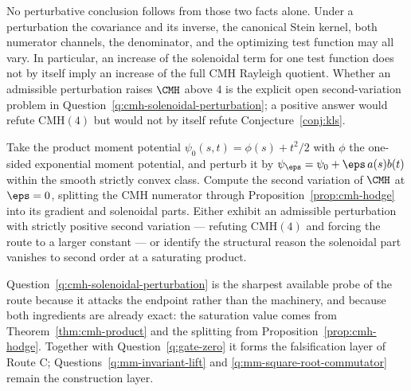 \documentclass[../../main.tex]{subfiles}
\begin{document}
\begin{remark}
No perturbative conclusion follows from those two facts alone. Under a perturbation the
covariance and its inverse, the canonical Stein kernel, both numerator channels, the
denominator, and the optimizing test function may all vary. In particular, an increase of the
solenoidal term for one test function does not by itself imply an increase of the full CMH
Rayleigh quotient. Whether an admissible perturbation raises $\CMH$ above $4$ is the explicit
open second-variation problem in Question~\ref{q:cmh-solenoidal-perturbation}; a positive answer
would refute $\mathrm{CMH}(4)$ but would not by itself refute Conjecture~\ref{conj:kls}.
\end{remark}

\begin{question}
\label{q:cmh-solenoidal-perturbation}
Take the product moment potential $\psi_0(s,t)=\phi(s)+t^2/2$ with $\phi$ the one-sided
exponential moment potential, and perturb it by $\psi_\eps=\psi_0+\eps\,a(s)b(t)$ within the
smooth strictly convex class. Compute the second variation of $\CMH$ at $\eps=0$, splitting the
CMH numerator through Proposition~\ref{prop:cmh-hodge} into its gradient and solenoidal parts.
Either exhibit an admissible perturbation with strictly positive second variation --- refuting
$\mathrm{CMH}(4)$ and forcing the route to a larger constant --- or identify the structural
reason the solenoidal part vanishes to second order at a saturating product.
\end{question}

Question~\ref{q:cmh-solenoidal-perturbation} is the sharpest available probe of the route
because it attacks the endpoint rather than the machinery, and because both ingredients are
already exact: the saturation value comes from Theorem~\ref{thm:cmh-product} and the splitting
from Proposition~\ref{prop:cmh-hodge}. Together with Question~\ref{q:gate-zero} it forms the
falsification layer of Route C; Questions~\ref{q:mm-invariant-lift} and
\ref{q:mm-square-root-commutator} remain the construction layer.
\end{document}
